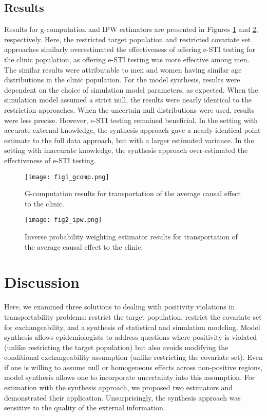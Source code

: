 \documentclass[]{article}
\begin{document}
\subsection*{Results}

Results for g-computation and IPW estimators are presented in Figures \ref{fig1} and \ref{fig2}, respectively. Here, the restricted target population and restricted covariate set approaches similarly overestimated the effectiveness of offering e-STI testing for the clinic population, as offering e-STI testing was more effective among men. The similar results were attributable to men and women having similar age distributions in the clinic population. For the model synthesis, results were dependent on the choice of simulation model parameters, as expected. When the simulation model assumed a strict null, the results were nearly identical to the restriction approaches. When the uncertain null distributions were used, results were less precise. However, e-STI testing remained beneficial. In the setting with accurate external knowledge, the synthesis approach gave a nearly identical point estimate to the full data approach, but with a larger estimated variance. In the setting with inaccurate knowledge, the synthesis approach over-estimated the effectiveness of e-STI testing.

\begin{figure}
	\centering
	\caption {G-computation results for transportation of the average causal effect to the clinic.}
	\texttt{[image: fig1\_gcomp.png]}
	\label{fig1}
\end{figure}

\begin{figure}
	\centering
	\caption {Inverse probability weighting estimator results for transportation of the average causal effect to the clinic.}
	\texttt{[image: fig2\_ipw.png]}
	\label{fig2}
\end{figure}


\section*{Discussion}

Here, we examined three solutions to dealing with positivity violations in transportability problems: restrict the target population, restrict the covariate set for exchangeability, and a synthesis of statistical and simulation modeling. Model synthesis allows epidemiologists to address questions where positivity is violated (unlike restricting the target population) but also avoids modifying the conditional exchangeability assumption (unlike restricting the covariate set). Even if one is willing to assume null or homogeneous effects across non-positive regions, model synthesis allows one to incorporate uncertainty into this assumption. For estimation with the synthesis approach, we proposed two estimators and demonstrated their application. Unsurprisingly, the synthesis approach was sensitive to the quality of the external information.
\end{document}
